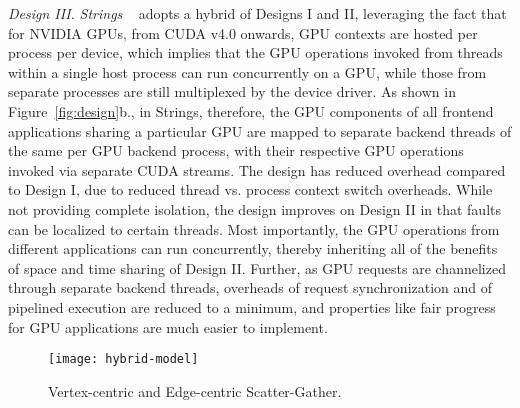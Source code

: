 \textit{Design III.} \textit{Strings} ~\cite{Strings} adopts a hybrid of Designs I and II, leveraging the fact that for NVIDIA GPUs, from CUDA v4.0 onwards, GPU contexts are hosted per process per device, which implies that the GPU operations invoked from threads within a single host process can run concurrently on a GPU, while those from separate processes are still multiplexed by the device driver. As shown in Figure~\ref{fig:design}b., in Strings, therefore, the GPU components of all frontend applications sharing a particular GPU are mapped to separate backend threads of the same per GPU backend process, with their respective GPU operations invoked via separate CUDA streams. The design has reduced overhead compared to Design I, due to reduced thread vs. process context switch overheads. While not providing complete isolation, the design improves on Design II in that faults can be localized to certain threads. Most importantly, the GPU operations from different applications can run concurrently, thereby inheriting all of the benefits of space and time sharing of Design II. Further, as GPU requests are channelized through separate backend threads, overheads of request synchronization and of pipelined execution are reduced to a minimum, and properties like fair progress for GPU applications are much easier to implement.

\begin{figure}[h]
\begin{center}
\texttt{[image: hybrid-model]}
\caption{\small Vertex-centric and Edge-centric Scatter-Gather.}
\label{fig:vertex-edge}
\end{center}
\end{figure}


